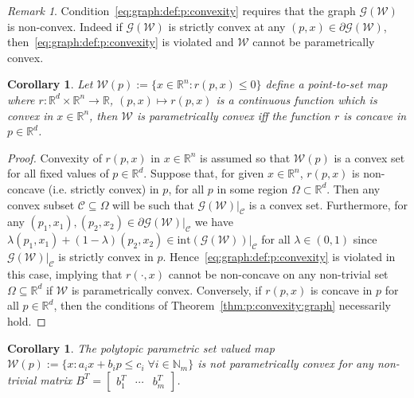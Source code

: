 \documentclass[journal]{IEEEtran}
\newcounter{thmcount}
\newtheorem{cor}[thmcount]{Corollary}
\theoremstyle{remark}
\newtheorem{rem}[thmcount]{Remark}
\theoremstyle{definition}
\begin{document}
%
\begin{rem}
Condition~\eqref{eq:graph:def:p:convexity} requires that the graph $\mathscr G(\mathcal W)$ is non-convex.
%
Indeed if $\mathscr G(\mathcal W)$ is strictly convex at any $(p,x)\in\partial \mathscr G (\mathcal W)$, then~\eqref{eq:graph:def:p:convexity} is violated and 
$\mathcal W$ cannot be parametrically convex.
\end{rem}
%
\begin{cor}
%
Let $\mathcal W(p):=\{x\in\mathbb R^n: r(p,x)\leq0\}$ define a point-to-set
map where 
$r: \mathbb R^d \times\mathbb R^n \rightarrow \mathbb R$, $(p,x)\mapsto r(p,x)$ is a continuous function which is convex in $x \in\mathbb R^n$, 
then $\mathcal W$ is parametrically
convex iff the function $r$ is concave in $p\in\mathbb R^d$.
%
\end{cor}
%
\begin{proof}
Convexity of $r(p,x)$ in $x\in\mathbb R^n$ is assumed so that $\mathcal W(p)$ is a convex set for all fixed values of $p\in\mathbb R^d$.
%
Suppose that, for given $x\in\mathbb R^n$, $r(p,x)$ is non-concave (i.e. 
strictly convex) in $p$, for all $p$ in some region $\Omega\subset\mathbb R^d$. 
Then any convex subset $\mathcal C\subseteq\Omega$ will be such that $\mathscr 
G(\mathcal W)\vert_{\mathcal C}$ is a convex set.
%
Furthermore, for any $(p_1,x_1),(p_2,x_2)\in \partial\mathscr G(\mathcal W)\vert_{\mathcal C}$ we have
$\lambda (p_1,x_1) + (1-\lambda) (p_2,x_2) \in\mathrm{int} (\mathscr G(\mathcal W))\vert_{\mathcal C}$ for all $\lambda\in(0,1)$ since
$\mathscr G(\mathcal W)\vert_{\mathcal C}$ is strictly convex in $p$.
%
Hence~\eqref{eq:graph:def:p:convexity} is violated in this case, implying that $r(\cdot,x)$ cannot be non-concave on any non-trivial set $\Omega\subseteq\mathbb R^d$ if $\mathcal W$ is parametrically convex. 
%
Conversely, if $r(p,x)$ is concave in $p$ for all $p\in\mathbb R^d$, then the conditions of Theorem~\ref{thm:p:convexity:graph} necessarily hold.
\end{proof}
%
\begin{cor}\label{thm:polytopic:set:not:p:convex}
The polytopic parametric set valued map $\mathcal W(p):=\{x: a_i x + b_i p\leq c_i \; \forall i\in\mathbb N_m\}$
is not parametrically convex for 
any non-trivial matrix $B^T = [\begin{matrix} b_1^T & \cdots & b_m^T\end{matrix}]$.
\end{cor}
\end{document}
